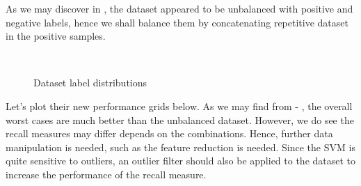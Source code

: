 \documentclass{tron}
\begin{document}
As we may discover in , the dataset appeared to be unbalanced with positive and negative labels, hence we shall balance them by concatenating repetitive dataset in the positive samples.
\begin{figure}[H]
\centering
	\,
	\caption{Dataset label distributions}
	\label{fig:p1:distributions}
\end{figure}

Let's plot their new performance grids below. As we may find from  - , the overall worst cases are much better than the unbalanced dataset. However, we do see the recall measures may differ depends on the combinations. Hence, further data manipulation is needed, such as the feature reduction is needed. Since the SVM is quite sensitive to outliers, an outlier filter should also be applied to the dataset to increase the performance of the recall measure.
\end{document}
